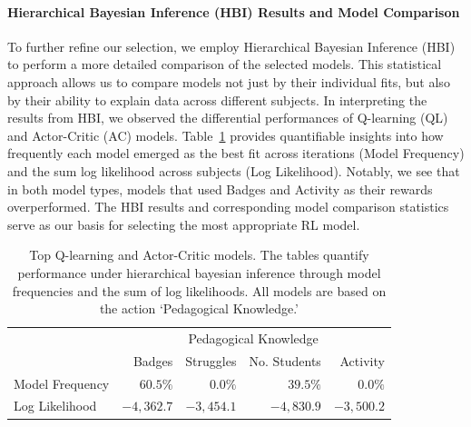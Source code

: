 \documentclass[
  number,
  preprint,
  3p,
  onecolumn]{elsarticle}
\let\oldparagraph\paragraph
\renewcommand{\paragraph}[1]{\oldparagraph{#1}\mbox{}}
\begin{document}
\paragraph{Hierarchical Bayesian Inference (HBI) Results and Model
Comparison}\label{hierarchical-bayesian-inference-hbi-results-and-model-comparison}

To further refine our selection, we employ Hierarchical Bayesian
Inference (HBI) to perform a more detailed comparison of the selected
models. This statistical approach allows us to compare models not just
by their individual fits, but also by their ability to explain data
across different subjects. In interpreting the results from HBI, we
observed the differential performances of Q-learning (QL) and
Actor-Critic (AC) models. Table~\ref{tbl-CBM-HBI} provides quantifiable
insights into how frequently each model emerged as the best fit across
iterations (Model Frequency) and the sum log likelihood across subjects
(Log Likelihood). Notably, we see that in both model types, models that
used Badges and Activity as their rewards overperformed. The HBI results
and corresponding model comparison statistics serve as our basis for
selecting the most appropriate RL model.

\begin{longtable}{l|rrrr}

\caption{\label{tbl-CBM-HBI}Top Q-learning and Actor-Critic models. The
tables quantify performance under hierarchical bayesian inference
through model frequencies and the sum of log likelihoods. All models are
based on the action `Pedagogical Knowledge.'}

\tabularnewline

\toprule
\multicolumn{1}{l}{} & \multicolumn{4}{c}{Pedagogical Knowledge} \\ 
\cmidrule(lr){2-5}
\multicolumn{1}{l}{} & Badges & Struggles & No. Students & Activity \\ 
\midrule\addlinespace[2.5pt]
Model Frequency & $60.5\%$ & $0.0\%$ & $39.5\%$ & $0.0\%$ \\ 
\midrule\addlinespace[2.5pt]
Log Likelihood & $-4,362.7$ & $-3,454.1$ & $-4,830.9$ & $-3,500.2$ \\ 
\bottomrule

\end{longtable}
\end{document}
